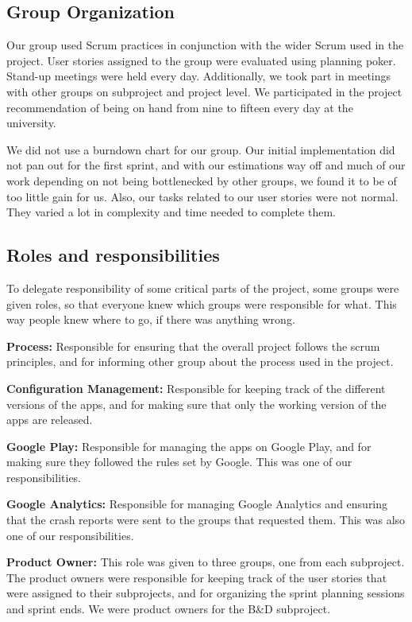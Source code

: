 \subsection{Group Organization}
Our group used Scrum practices in conjunction with the wider Scrum used in the project. User stories assigned to the group were evaluated using planning poker. Stand-up meetings were held every day. Additionally, we took part in meetings with other groups on subproject and project level. We participated in the project recommendation of being on hand from nine to fifteen every day at the university.

We did not use a burndown chart for our group. Our initial implementation did not pan out for the first sprint, and with our estimations way off and much of our work depending on not being bottlenecked by other groups, we found it to be of too little gain for us. Also, our tasks related to our user stories were not normal. They varied a lot in complexity and time needed to complete them.

\subsection{Roles and responsibilities}
To delegate responsibility of some critical parts of the project, some groups were given roles, so that everyone knew which groups were responsible for what. This way people knew where to go, if there was anything wrong.


\textbf{Process:}
Responsible for ensuring that the overall project follows the scrum principles, and for informing other group about the process used in the project.

\textbf{Configuration Management:}
Responsible for keeping track of the different versions of the apps, and for making sure that only the working version of the apps are released.

\textbf{Google Play:}
Responsible for managing the apps on Google Play, and for making sure they followed the rules set by Google. This was one of our responsibilities.

\textbf{Google Analytics:}
Responsible for managing Google Analytics and ensuring that the crash reports were sent to the groups that requested them. This was also one of our responsibilities.

\textbf{Product Owner:}
This role was given to three groups, one from each subproject. The product owners were responsible for keeping track of the user stories that were assigned to their subprojects, and for organizing the sprint planning sessions and sprint ends. We were product owners for the B\&D subproject.

